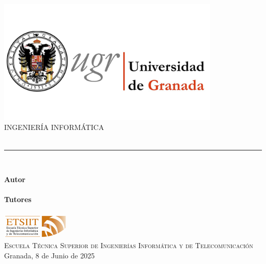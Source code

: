 \begin{titlepage}

  \newlength{\centeroffset}
  \setlength{\centeroffset}{-0.5\oddsidemargin}
  \addtolength{\centeroffset}{0.5\evensidemargin}
  \thispagestyle{empty}

  \noindent\hspace*{\centeroffset}\begin{minipage}{\textwidth}
    \centering
    \includegraphics[width=0.8\textwidth]{figures/logo_ugr_general.jpg}\\[1.2cm]

    \textsc{INGENIERÍA INFORMÁTICA}\\[0.8cm]

    {\huge\bfseries \myTitle\\[1ex]}
    \noindent\rule[-1ex]{\textwidth}{2pt}\\[2.5ex]
  \end{minipage}

  \vspace{2cm}
  \noindent\hspace*{\centeroffset}\begin{minipage}{\textwidth}
    \centering

    \textbf{Autor}\\[0.5ex]
    {\myName}\\[2ex]

    \textbf{Tutores}\\[0.5ex]
    {\myProf}\\[2cm]

    \includegraphics[width=0.25\textwidth]{figures/etsiit_logo.png}\\[0.5cm]
    \textsc{Escuela Técnica Superior de Ingenierías Informática y de Telecomunicación}\\
    Granada, 8 de Junio de 2025
  \end{minipage}

\end{titlepage}
